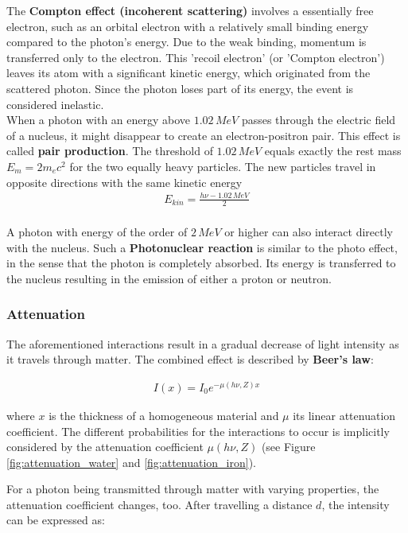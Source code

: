 The \textbf{Compton effect (incoherent scattering)} involves a essentially free electron, such as an orbital electron with a relatively small binding energy compared to the photon's energy.
Due to the weak binding, momentum is transferred only to the electron.
This 'recoil electron' (or 'Compton electron') leaves its atom with a significant kinetic energy, which originated from the scattered photon.
Since the photon loses part of its energy, the event is considered inelastic. \\

When a photon with an energy above $1.02 \, MeV$ passes through the electric field of a nucleus, it might disappear to create an electron-positron pair.
This effect is called \textbf{pair production}.
The threshold of $1.02 \, MeV$ equals exactly the rest mass $E_m = 2m_ec^2$ for the two equally heavy particles.
The new particles travel in opposite directions with the same kinetic energy
\begin{align}
 E_{kin} = \frac{h\nu - 1.02 \, MeV}{2}
\end{align} \\

A photon with energy of the order of $2 \, MeV$ or higher can also interact directly with the nucleus.
Such a \textbf{Photonuclear reaction} is similar to the photo effect, in the sense that the photon is completely absorbed.
Its energy is transferred to the nucleus resulting in the emission of either a proton or neutron. \cite{Podgorsak, Maidment2014}\\

\subsubsection{Attenuation}
The aforementioned interactions result in a gradual decrease of light intensity as it travels through matter.
The combined effect is described by \textbf{Beer's law}:

\begin{align}
I(x) = I_0 e^{-\mu(h\nu,Z)x}
\end{align}

where $x$ is the thickness of a homogeneous material and $\mu$ its linear attenuation coefficient.
The different probabilities for the interactions to occur is implicitly considered by the attenuation coefficient $\mu(h\nu,Z)$ (see Figure \ref{fig:attenuation_water} and \ref{fig:attenuation_iron}).

For a photon being transmitted through matter with varying properties, the attenuation coefficient changes, too.
After travelling a distance $d$, the intensity can be expressed as:

